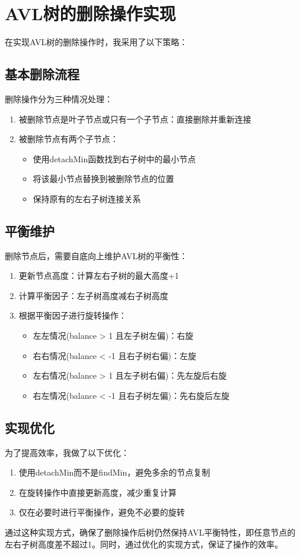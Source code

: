 \documentclass[UTF8]{ctexart}
\begin{document}
\pagestyle{fancy}
\fancyhead{}

\section{AVL树的删除操作实现}

在实现AVL树的删除操作时，我采用了以下策略：

\subsection{基本删除流程}

删除操作分为三种情况处理：
\begin{enumerate}
    \item 被删除节点是叶子节点或只有一个子节点：直接删除并重新连接
    \item 被删除节点有两个子节点：
        \begin{itemize}
            \item 使用detachMin函数找到右子树中的最小节点
            \item 将该最小节点替换到被删除节点的位置
            \item 保持原有的左右子树连接关系
        \end{itemize}
\end{enumerate}

\subsection{平衡维护}

删除节点后，需要自底向上维护AVL树的平衡性：

\begin{enumerate}
    \item 更新节点高度：计算左右子树的最大高度+1
    \item 计算平衡因子：左子树高度减右子树高度
    \item 根据平衡因子进行旋转操作：
        \begin{itemize}
            \item 左左情况(balance > 1 且左子树左偏)：右旋
            \item 右右情况(balance < -1 且右子树右偏)：左旋
            \item 左右情况(balance > 1 且左子树右偏)：先左旋后右旋
            \item 右左情况(balance < -1 且右子树左偏)：先右旋后左旋
        \end{itemize}
\end{enumerate}

\subsection{实现优化}

为了提高效率，我做了以下优化：
\begin{enumerate}
    \item 使用detachMin而不是findMin，避免多余的节点复制
    \item 在旋转操作中直接更新高度，减少重复计算
    \item 仅在必要时进行平衡操作，避免不必要的旋转
\end{enumerate}

通过这种实现方式，确保了删除操作后树仍然保持AVL平衡特性，即任意节点的左右子树高度差不超过1。同时，通过优化的实现方式，保证了操作的效率。
\end{document}

